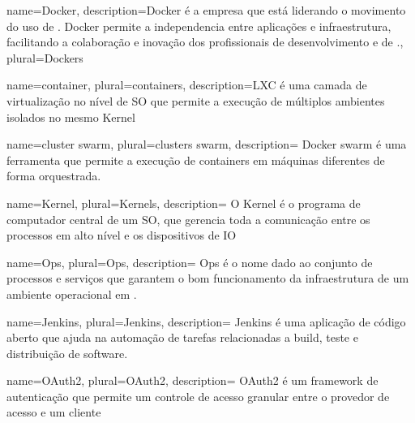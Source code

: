 
{
  name=Docker,
  description={Docker é a empresa que está liderando o movimento do uso de . Docker permite a independencia entre aplicações e infraestrutura, facilitando a colaboração e inovação dos profissionais de desenvolvimento e de .},
  plural=Dockers
}

{
  name=container,
  plural=containers,
  description={\gls{LXC} é uma camada de virtualização no nível de \gls{SO} que permite a execução de múltiplos ambientes isolados no mesmo \gls{Kernel}
  }
}

{
  name=cluster swarm,
  plural=clusters swarm,
  description={
    \gls{Docker} swarm é uma ferramenta que permite a execução de \glspl{container} em máquinas diferentes de forma orquestrada.
  }
}

{
  name=Kernel,
  plural=Kernels,
  description={
    O Kernel é o programa de computador central de um \gls{SO}, que gerencia toda a comunicação entre os processos em alto nível e os dispositivos de \gls{IO}
  }
}

{
  name=Ops,
  plural=Ops,
  description={
    Ops é o nome dado ao conjunto de processos e serviços que garantem o bom funcionamento da infraestrutura de um ambiente operacional em .
  }
}

{
  name=Jenkins,
  plural=Jenkins,
  description={
    Jenkins é uma aplicação de código aberto que ajuda na automação de tarefas relacionadas a build, teste e distribuição de software.
  }
}

{
  name=OAuth2,
  plural=OAuth2,
  description={
    OAuth2 é um framework de autenticação que permite um controle de acesso granular entre o provedor de acesso e um cliente
  }
}


